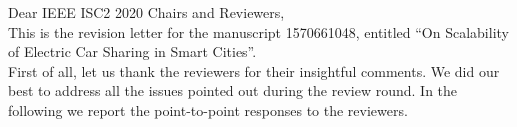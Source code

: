 \documentclass{paper}
\begin{document}
\noindent
Dear IEEE ISC2 2020 Chairs and Reviewers, \\

\noindent
This is the revision letter for the manuscript 1570661048, entitled ``On Scalability of Electric Car Sharing in Smart Cities''. \\

\noindent
First of all, let us thank the reviewers for their insightful comments. We did our best to address all the issues pointed out during the review round. In the following we report the point-to-point responses to the reviewers. 
  
  

\noindent
\end{document}
